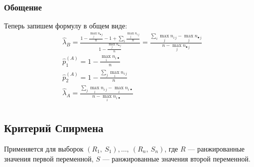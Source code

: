 \documentclass[12pt, a4paper]{article}
\begin{document}
\subsubsection*{Обощение}
Теперь запишем формулу в общем виде:
\begin{equation*}
    \begin{aligned}
        &\hat \lambda_B = \frac{ 1 - \frac{\max\limits_j n_{\bullet\, j}}{n} - 1 + \sum\limits_{i} \frac{\max\limits_j n_{i\, j}}{n} }{1 - \frac{\max_{j} n_{\bullet\, j}}{n}} = \frac{\sum\limits_{i} \max\limits_{j} n_{i\, j} - \max\limits_j n_{\bullet\, j}}{ n - \max\limits_j n_{\bullet\, j} }\\
        &\hat p_1^{(A)} = 1 - \frac{\max\limits_i n_{i\, \bullet} }{n}\\
        &\hat p_2^{(A)} = 1 - \frac{\sum\limits_{j} \max\limits_{i} n_{i\, j}}{n}\\
        &\hat \lambda_A = \frac{\sum\limits_{j} \max\limits_{i} n_{i\, j} - \max\limits_i n_{i\, \bullet}}{ n - \max\limits_i n_{i\, \bullet} }\\
    \end{aligned}
\end{equation*}
\subsection*{Критерий Спирмена}
Применяется для выборок $(R_1,\ S_1),\dots,\ (R_n,\ S_n)$, где $R$ --- ранжированные значения первой переменной, $S$ --- ранжированные значения второй переменной.
\end{document}
